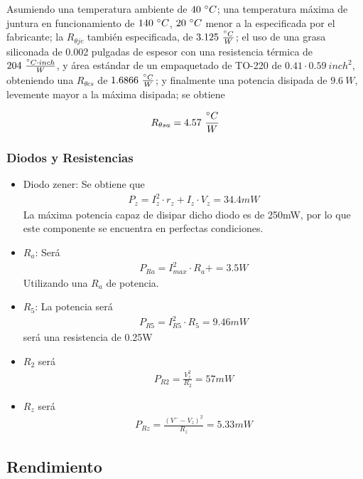 Asumiendo una temperatura ambiente de $40 \ \degree C$; una temperatura máxima de juntura en funcionamiento de $140 \ \degree C$, $20 \ \degree C$ menor a la especificada por el fabricante; la $R_{\theta jc}$ también especificada, de $3.125 \ \frac{\degree C}{W}$; el uso de una grasa siliconada de 0.002 pulgadas de espesor con una resistencia térmica de $204 \ \frac{\degree C \cdot inch}{W}$, y área estándar de un empaquetado de TO-220 de $0.41\cdot 0.59 \ inch^2$, obteniendo una $R_{\theta cs}$ de $1.6866 \ \frac{\degree C}{W}$; y finalmente una potencia disipada de $9.6 \ W$, levemente mayor a la máxima disipada; se obtiene

\begin{equation}
R_{\theta sa} = 4.57 \ \frac{\degree C}{W}
\end{equation}
\subsubsection{Diodos y Resistencias}
\begin{itemize}
\item Diodo zener:
Se obtiene que
\begin{align}
P_{z}=I_{z}^2\cdot r_z+I_z \cdot V_z = 34.4mW
\end{align}
La máxima potencia capaz de disipar dicho diodo es de 250mW, por lo que este componente se encuentra en perfectas condiciones.
\item $R_a$: Será 
\begin{align}
P_{Ra}=I_{max}^2\cdot R_a+ = 3.5W
\end{align}
Utilizando una $R_a$ de potencia.
\item $R_5$:
La potencia será 
\begin{align}
P_{R5}=I_{R5}^2\cdot R_5 = 9.46mW
\end{align}
será una resistencia de 0.25W
\item $R_2$
será
\begin{align}
P_{R2}=\frac{V_z^2}{R_2} = 57mW
\end{align}
\item $R_z$
será
\begin{align}
P_{Rz}=\frac{(V^- - V_z)^2}{R_z} = 5.33mW
\end{align}

\end{itemize}


\subsection{Rendimiento}


